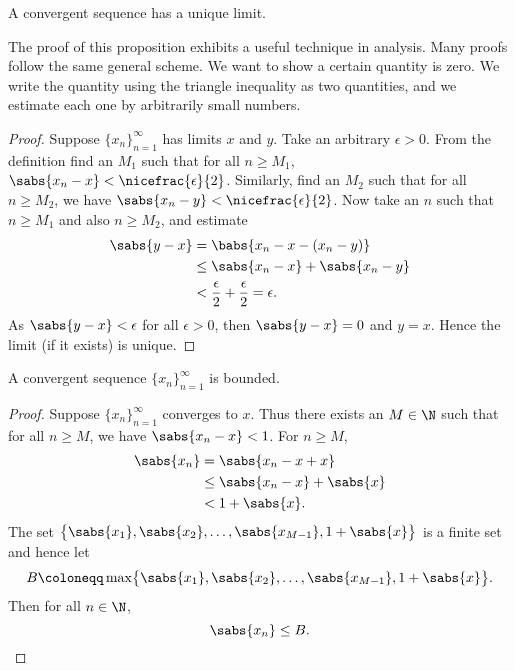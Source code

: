 \begin{prop} \label{prop:limisunique}
A convergent sequence has a unique limit.
\end{prop}

The proof of this proposition exhibits a useful technique in
analysis.  Many proofs follow the same general scheme.  We want to
show a certain quantity is zero.  We write the quantity using the 
triangle inequality as two quantities, and we estimate each one
by arbitrarily small numbers.

\begin{proof}
Suppose $\{ x_n \}_{n=1}^\infty$ has limits $x$ and $y$.
Take an arbitrary $\epsilon > 0$.
From the definition find an $M_1$ such that for all $n \geq M_1$,
$\sabs{x_n-x} < \nicefrac{\epsilon}{2}$.  Similarly, find an $M_2$
such that for all $n \geq M_2$, we have
$\sabs{x_n-y} < \nicefrac{\epsilon}{2}$.
Now take an $n$ such that $n \geq M_1$ and also $n \geq M_2$, and estimate
\begin{equation*}
\begin{split}
\sabs{y-x}
& =
\babs{x_n-x - (x_n -y)} \\
& \leq
\sabs{x_n-x} + \sabs{x_n -y} \\
& <
\frac{\epsilon}{2} + \frac{\epsilon}{2} = \epsilon .
\end{split}
\end{equation*}
As $\sabs{y-x} < \epsilon$ for all $\epsilon > 0$, then $\sabs{y-x} = 0$
and $y=x$.  Hence the limit (if it exists) is unique.
\end{proof}

\begin{prop}
A convergent sequence $\{ x_n \}_{n=1}^\infty$ is bounded.
\end{prop}

\begin{proof}
Suppose $\{ x_n \}_{n=1}^\infty$ converges to $x$.  Thus there exists an $M \in \N$
such that for all $n \geq M$, we have
$\sabs{x_n - x} < 1$.  For $n \geq M$,
\begin{equation*}
\begin{split}
\sabs{x_n} & = \sabs{x_n - x + x}
\\
& \leq \sabs{x_n - x} + \sabs{x}
\\
& < 1 + \sabs{x} .
\end{split}
\end{equation*}
The set $\bigl\{ \sabs{x_1}, \sabs{x_2}, \ldots, \sabs{x_{M-1}} , 1+\sabs{x} \bigr\}$
is a finite set and hence let
\begin{equation*}
B \coloneqq \max \bigl\{ \sabs{x_1}, \sabs{x_2}, \ldots, \sabs{x_{M-1}}, 1+\sabs{x} \bigr\} .
\end{equation*}
Then for all $n \in \N$,
\begin{equation*}
\sabs{x_n} \leq B. \qedhere
\end{equation*}
\end{proof}

